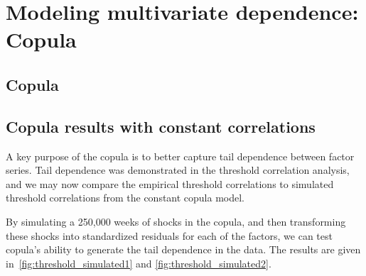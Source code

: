 \section{Modeling multivariate dependence: Copula} %
\label{sec:multivariate_modeling}

\subsection{Copula}

\subsection{Copula results with constant correlations}
A key purpose of the copula is to better capture tail dependence between factor series. Tail dependence was demonstrated in the threshold correlation analysis, and we may now compare the empirical threshold correlations to simulated threshold correlations from the constant copula model. 

By simulating a 250,000 weeks of shocks in the copula, and then transforming these shocks into standardized residuals for each of the factors, we can test copula's ability to generate the tail dependence in the data. The results are given in~\autoref{fig:threshold_simulated1} and \autoref{fig:threshold_simulated2}.

